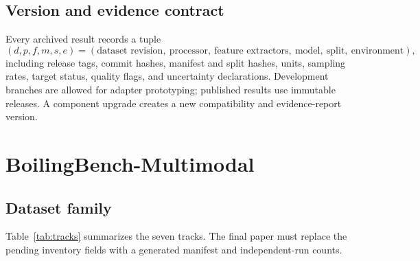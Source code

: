\documentclass[11pt]{article}
\begin{document}
\subsection{Version and evidence contract}

Every archived result records a tuple
\begin{equation}
  (d, p, f, m, s, e) = (\text{dataset revision},\ \text{processor},\ \text{feature extractors},\ \text{model},\ \text{split},\ \text{environment}),
\end{equation}
including release tags, commit hashes, manifest and split hashes, units, sampling rates, target status, quality flags, and uncertainty declarations. Development branches are allowed for adapter prototyping; published results use immutable releases. A component upgrade creates a new compatibility and evidence-report version.

\section{BoilingBench-Multimodal}
\label{sec:dataset}

\subsection{Dataset family}

Table~\ref{tab:tracks} summarizes the seven tracks. The final paper must replace the pending inventory fields with a generated manifest and independent-run counts.
\end{document}
